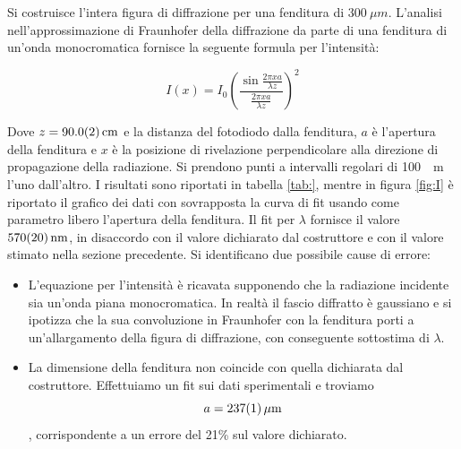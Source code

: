 \documentclass[10pt,oneside,a4paper]{article}
\begin{document}
\begin{multicols}{2}
Si costruisce l'intera figura di diffrazione per una fenditura di $\SI{300}{\mu m}$. L'analisi nell'approssimazione di Fraunhofer della diffrazione da parte di una fenditura di un'onda monocromatica fornisce la seguente formula per l'intensità:

$$I(x) = I_0 (\frac{\sin\frac{2\pi xa}{\lambda z}}{\frac{2\pi xa}{\lambda z}})^2 $$


Dove $z = \SI{90.0 \pm 0.2}{cm}$ e la distanza del fotodiodo dalla fenditura, $a$ è l'apertura della fenditura e $x$ è la posizione di rivelazione perpendicolare alla direzione di propagazione della radiazione.
Si prendono punti a intervalli regolari di \SI{100}{\mu m} l'uno dall'altro. I risultati sono riportati in tabella \ref{tab:}, mentre in figura \ref{fig:I} è riportato il grafico dei dati con sovrapposta la curva di fit usando come parametro libero l'apertura della fenditura. Il fit per $\lambda$ fornisce il valore $\SI{570 \pm 20}{nm}$, in disaccordo con il valore dichiarato dal costruttore e con il valore stimato nella sezione precedente. Si identificano due possibile cause di errore:
\begin{itemize}
\item L'equazione per l'intensità è ricavata supponendo che la radiazione incidente sia un'onda piana monocromatica. In realtà il fascio diffratto è gaussiano e si ipotizza che la sua convoluzione in Fraunhofer con la fenditura porti a un'allargamento della figura di diffrazione, con conseguente sottostima di $\lambda$.
\item La dimensione della fenditura non coincide con quella dichiarata dal costruttore. Effettuiamo un fit sui dati sperimentali e troviamo $$a = \SI{237 \pm 1}{\mu m}$$, corrispondente a un errore del 21\% sul valore dichiarato.
\end{itemize}


\end{multicols}
\end{document}
